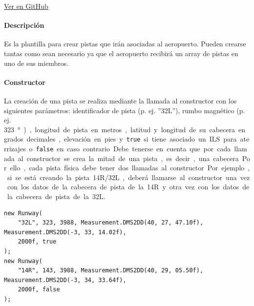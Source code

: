 \vspace{-0.85cm}
\begin{flushright}
\href{https://github.com/macgyver912/atc-simulator/blob/jaime/Assets/Scripts/airports/Runway.cs}{Ver en GitHub \faGithub}
\end{flushright}

\paragraph{Descripción} \phantom{\newline}

Es la plantilla para crear pistas que irán asociadas al aeropuerto. Pueden crearse tantas como sean necesario ya que el aeropuerto recibirá un array de pistas en uno de sus miembros.

\paragraph{Constructor} \phantom{\newline}

La creación de una pista se realiza mediante la llamada al constructor con los siguientes parámetros: identificador de pista (p. ej. ''32L''), rumbo magnético (p. ej. \SI{323}\degree), longitud de pista en metros, latitud y longitud de su cabecera en grados decimales, elevación en pies y \texttt{true} si tiene asociado un ILS para aterrizajes o \texttt{false} en caso contrario.

Debe tenerse en cuenta que por cada llamada al constructor se crea la mitad de una pista, es decir, una cabecera. Por ello, cada pista física debe tener dos llamadas al constructor. Por ejemplo, si se está creando la pista 14R/32L, deberá llamarse al constructor una vez con los datos de la cabecera de pista de la 14R y otra vez con los datos de la cabecera de pista de la 32L.

\begin{table}[!hbtp]
	\caption{Ejemplo de instancia al constructor de la clase \texttt{Runway}.}
	\label{tab:EjemploRunway}
\end{table}
\vspace{-0.8cm}
\begin{scriptsize}
\begin{Verbatim}[frame=single]
new Runway(
    "32L", 323, 3988, Measurement.DMS2DD(40, 27, 47.10f), Measurement.DMS2DD(-3, 33, 14.02f), 
    2000f, true
);
new Runway(
    "14R", 143, 3988, Measurement.DMS2DD(40, 29, 05.50f), Measurement.DMS2DD(-3, 34, 33.64f), 
    2000f, false
);
\end{Verbatim}
\end{scriptsize}






